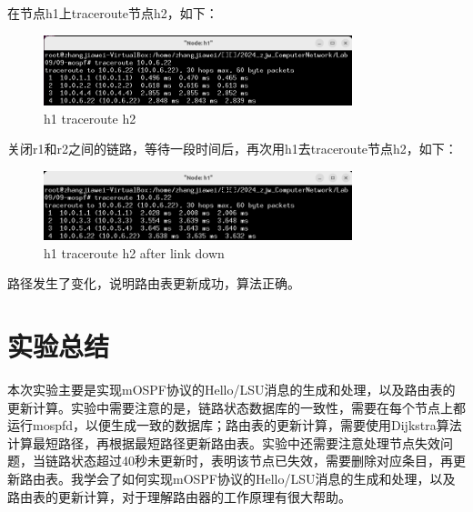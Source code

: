 \documentclass[UTF8]{report}
\begin{document}
在节点h1上traceroute节点h2，如下：

\begin{figure}[H]
    \centering
    \includegraphics[width=0.8\textwidth]{h1trh2.png}
    \caption{h1 traceroute h2}
\end{figure}

关闭r1和r2之间的链路，等待一段时间后，再次用h1去traceroute节点h2，如下：

\begin{figure}[H]
    \centering
    \includegraphics[width=0.8\textwidth]{h1trh2_2.png}
    \caption{h1 traceroute h2 after link down}
\end{figure}

路径发生了变化，说明路由表更新成功，算法正确。

\section{实验总结}

本次实验主要是实现mOSPF协议的Hello/LSU消息的生成和处理，以及路由表的更新计算。实验中需要注意的是，链路状态数据库的一致性，需要在每个节点上都运行mospfd，以便生成一致的数据库；路由表的更新计算，需要使用Dijkstra算法计算最短路径，再根据最短路径更新路由表。实验中还需要注意处理节点失效问题，当链路状态超过40秒未更新时，表明该节点已失效，需要删除对应条目，再更新路由表。我学会了如何实现mOSPF协议的Hello/LSU消息的生成和处理，以及路由表的更新计算，对于理解路由器的工作原理有很大帮助。
\end{document}
